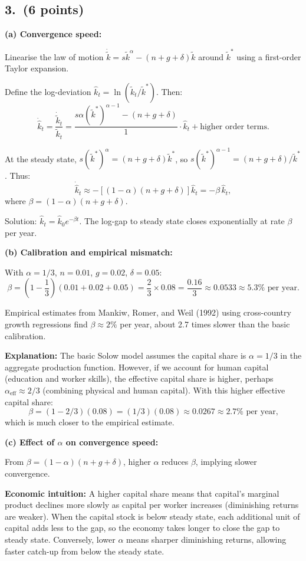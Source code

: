 \documentclass[a4paper,11pt]{article}
\newcommand{\ktilde}{\tilde{k}}
\begin{document}
\subsection*{3.\ (6 points)}

\begin{answerbox}
\textbf{(a) Convergence speed:}

Linearise the law of motion $\dot{\ktilde} = s\ktilde^\alpha - (n+g+\delta)\ktilde$ around $\ktilde^*$ using a first-order Taylor expansion.

Define the log-deviation $\hat{k}_t = \ln(\ktilde_t/\ktilde^*)$. Then:
\[
    \dot{\hat{k}}_t = \frac{\dot{\ktilde}_t}{\ktilde_t} = \frac{s\alpha(\ktilde^*)^{\alpha-1} - (n+g+\delta)}{1}\cdot\hat{k}_t + \text{higher order terms}.
\]

At the steady state, $s(\ktilde^*)^\alpha = (n+g+\delta)\ktilde^*$, so $s(\ktilde^*)^{\alpha-1} = (n+g+\delta)/\ktilde^*$.  Thus:
\[
    \dot{\hat{k}}_t \approx -\left[(1-\alpha)(n+g+\delta)\right]\hat{k}_t = -\beta\,\hat{k}_t,
\]
where $\boxed{\beta = (1-\alpha)(n+g+\delta)}$.

Solution: $\hat{k}_t = \hat{k}_0 e^{-\beta t}$. The log-gap to steady state closes exponentially at rate $\beta$ per year.

\textbf{(b) Calibration and empirical mismatch:}

With $\alpha = 1/3$, $n = 0.01$, $g = 0.02$, $\delta = 0.05$:
\[
    \beta = \left(1 - \frac{1}{3}\right)(0.01 + 0.02 + 0.05)
    = \frac{2}{3} \times 0.08 = \frac{0.16}{3} \approx 0.0533 \approx 5.3\% \text{ per year}.
\]

Empirical estimates from Mankiw, Romer, and Weil (1992) using cross-country growth regressions find $\beta \approx 2\%$ per year, about 2.7 times slower than the basic calibration.

\textbf{Explanation:} The basic Solow model assumes the capital share is $\alpha = 1/3$ in the aggregate production function. However, if we account for human capital (education and worker skills), the effective capital share is higher, perhaps $\alpha_{\text{eff}} \approx 2/3$ (combining physical and human capital). With this higher effective capital share:
\[
    \beta = (1 - 2/3)(0.08) = (1/3)(0.08) \approx 0.0267 \approx 2.7\% \text{ per year,}
\]
which is much closer to the empirical estimate.

\textbf{(c) Effect of $\alpha$ on convergence speed:}

From $\beta = (1-\alpha)(n+g+\delta)$, higher $\alpha$ reduces $\beta$, implying slower convergence.

\textbf{Economic intuition:} A higher capital share means that capital's marginal product declines more slowly as capital per worker increases (diminishing returns are weaker). When the capital stock is below steady state, each additional unit of capital adds less to the gap, so the economy takes longer to close the gap to steady state. Conversely, lower $\alpha$ means sharper diminishing returns, allowing faster catch-up from below the steady state.
\end{answerbox}
\end{document}
